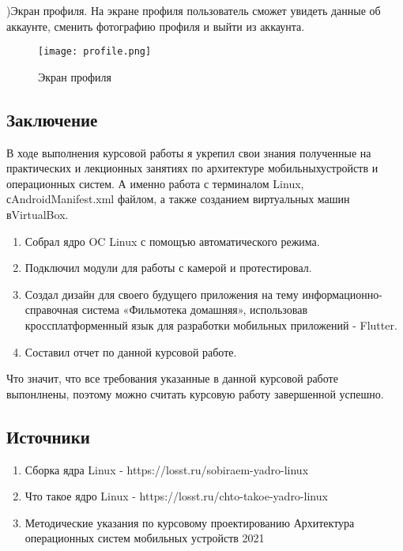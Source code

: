 )Экран профиля. На экране профиля пользователь сможет увидеть данные об аккаунте, сменить фотографию профиля и выйти из аккаунта.
\begin{figure}[h!]
\centering
\texttt{[image: profile.png]}
\caption{Экран профиля}
\label{fig:profile}
\end{figure}
\newpage
\begin{center}
\section*{Заключение}
\end{center}
В ходе выполнения курсовой работы я укрепил свои знания полученные на практических и лекционных занятиях по архитектуре мобильных\newline устройств и операционных систем. А именно работа с терминалом Linux, с\newline AndroidManifest.xml файлом, а также созданием виртуальных машин в\newline VirtualBox.
\begin{enumerate}
\item Собрал ядро OC Linux с помощъю автоматического режима.
\item Подключил модули для работы с камерой и протестировал. 
\item Создал дизайн для своего будущего приложения на тему информационно-справочная система «Фильмотека домашняя», использовав кроссплатформенный язык для разработки мобильных приложений - Flutter.
\item Составил отчет по данной курсовой работе.
\end{enumerate}
Что значит, что все требования указанные в данной курсовой работе выпонлнены, поэтому можно считать курсовую работу завершенной успешно.

\newpage
\begin{center}
\section*{Источники}
\end{center}
\begin{enumerate}
\item Сборка ядра Linux - https://losst.ru/sobiraem-yadro-linux
\item Что такое ядро Linux - https://losst.ru/chto-takoe-yadro-linux
\item Методические указания по курсовому проектированию Архитектура операционных систем мобильных устройств 2021
\end{enumerate}

